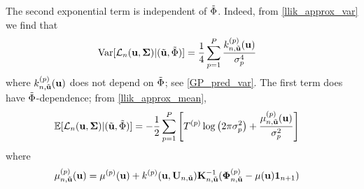 \documentclass[12pt]{article}
\begin{document}
The second exponential term is independent of $\tilde{\SSR}$. Indeed, from \ref{llik_approx_var} we find that
\begin{align*}
\Var[\llik_{\designIdx}(\bpar, \CovObs) | (\tilde{\bpar}, \tilde{\SSR})] &= \frac{1}{4} \sum_{\objIdx = 1}^{\Nobj} \frac{\GPKerPredOut{\designIdx, \tilde{\bpar}}{\objIdx}(\bpar)}{\sdObs_{\objIdx}^4}
\end{align*}
where $\GPKerPredOut{\designIdx, \tilde{\bpar}}{\objIdx}(\bpar)$ does not depend on $\tilde{\SSR}$; see \ref{GP_pred_var}. The first term does have $\tilde{\SSR}$-dependence; from \ref{llik_approx_mean},
\begin{align*}
\E[\llik_{\designIdx}(\bpar, \CovObs) | (\tilde{\bpar}, \tilde{\SSR})] &= -\frac{1}{2} \sum_{\objIdx = 1}^{\Nobj} \left[\indexObj{\Ntime} \log\left(2\postDens \sdObs_{\objIdx}^2 \right) + \frac{\GPMeanPredOut{\designIdx, \tilde{\bpar}}{\objIdx}(\bpar)}{\sdObs_{\objIdx}^2} \right]
\end{align*}
where 
\begin{align*}
\indexDesignObj{\GPMean}{\designIdx,\tilde{\bpar}}(\bpar) &= \indexObj{\GPMean}(\bpar) + 
\indexObj{\GPKer}(\bpar, \designMat[\designIdx, \tilde{\bpar}]) \KerMat[\designIdx, \tilde{\bpar}]^{-1} (\indexDesignObj{\SSRObs}{\designIdx, \tilde{\bpar}} - \GPMean(\bpar)\oneVec{\designIdx+1})
\end{align*}


 

\end{document}
